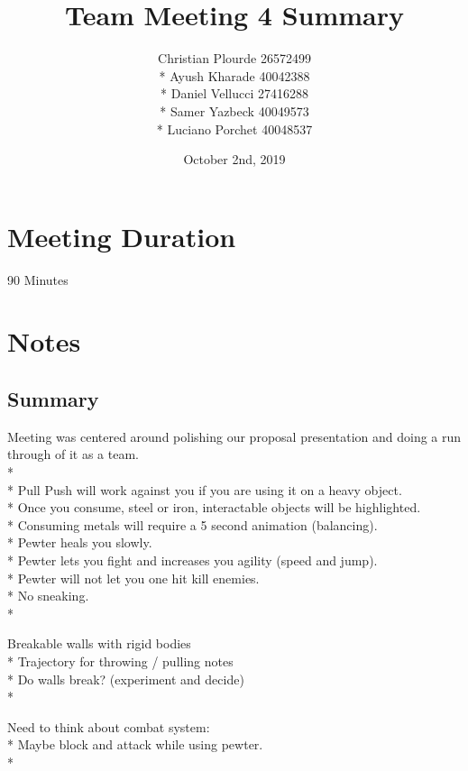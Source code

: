 \documentclass{article}
\begin{document}
\title{Team Meeting 4 Summary}
\author{Christian Plourde 26572499\\*
		Ayush Kharade 40042388\\*
		Daniel Vellucci 27416288\\*
		Samer Yazbeck 40049573\\*
		Luciano Porchet 40048537
		}
\date{October 2nd, 2019}

\maketitle

\newpage

\section{Meeting Duration}
90 Minutes

\section{Notes}

\subsection{Summary}
Meeting was centered around polishing our proposal presentation and doing a run through of it as a team.\\*
\\*
Pull Push will work against you if you are using it on a heavy object.\\*
Once you consume, steel or iron, interactable objects will be highlighted.\\*
Consuming metals will require a 5 second animation (balancing).\\*
Pewter heals you slowly.\\*
Pewter lets you fight and increases you agility (speed and jump).\\*
Pewter will not let you one hit kill enemies.\\*
No sneaking.\\*

Breakable walls with rigid bodies\\*
Trajectory for throwing / pulling notes\\*
Do walls break? (experiment and decide)\\*

Need to think about combat system:\\*
Maybe block and attack while using pewter.\\*
\end{document}

